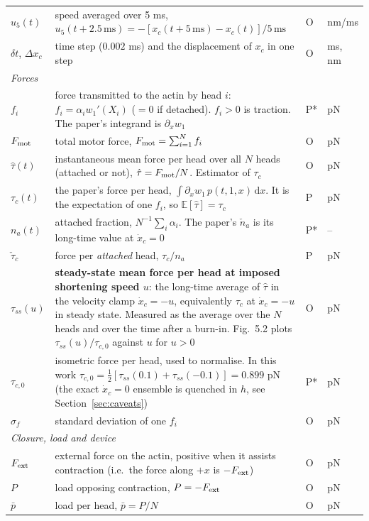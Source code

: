 \documentclass[11pt,a4paper]{article}
\newcommand{\dd}{\mathrm{d}}
\newcommand{\tauz}{\tau_{c,0}}
\begin{document}
{\begin{longtable}{p{2.5cm}p{8.5cm}p{1.0cm}p{1.9cm}}
$u_5(t)$ & speed averaged over 5 ms, $u_5(t+2.5\,\mathrm{ms})=-[x_c(t+5\,\mathrm{ms})-x_c(t)]/5\,\mathrm{ms}$ & O & nm/ms\\
$\delta t$, $\Delta x_c$ & time step ($0.002$ ms) and the displacement of $x_c$ in one step & O & ms, nm\\
\midrule
\multicolumn{4}{l}{\emph{Forces}}\\
$f_i$ & force transmitted to the actin by head $i$: $f_i=\alpha_iw_1'(X_i)$ ($=0$ if detached). $f_i>0$ is traction. The paper's integrand is $\partial_xw_1$ & P* & pN\\
$F_{\rm mot}$ & total motor force, $F_{\rm mot}=\sum_{i=1}^Nf_i$ & O & pN\\
$\hat\tau(t)$ & instantaneous mean force per head over all $N$ heads (attached or not), $\hat\tau=F_{\rm mot}/N$. Estimator of $\tau_c$ & O & pN\\
$\tau_c(t)$ & the paper's force per head, $\int\partial_xw_1\,p(t,1,x)\,\dd x$. It is the expectation of one $f_i$, so $\mathbb E[\hat\tau]=\tau_c$ & P & pN\\
$n_a(t)$ & attached fraction, $N^{-1}\sum_i\alpha_i$. The paper's $\check n_a$ is its long-time value at $\dot x_c=0$ & P* & --\\
$\check\tau_c$ & force per \emph{attached} head, $\tau_c/n_a$ & P & pN\\
$\tau_{ss}(u)$ & \textbf{steady-state mean force per head at imposed shortening speed $u$}: the long-time average of $\hat\tau$ in the velocity clamp $\dot x_c=-u$, equivalently $\tau_c$ at $\dot x_c=-u$ in steady state. Measured as the average over the $N$ heads and over the time after a burn-in. Fig.~5.2 plots $\tau_{ss}(u)/\tauz$ against $u$ for $u>0$ & O & pN\\
$\tau_{c,0}$ & isometric force per head, used to normalise. In this work $\tauz=\tfrac12[\tau_{ss}(0.1)+\tau_{ss}(-0.1)]=0.899$ pN (the exact $\dot x_c=0$ ensemble is quenched in $h$, see Section~\ref{sec:caveats}) & P* & pN\\
$\sigma_f$ & standard deviation of one $f_i$ & O & pN\\
\midrule
\multicolumn{4}{l}{\emph{Closure, load and device}}\\
$F_{\rm ext}$ & external force on the actin, positive when it assists contraction (i.e.\ the force along $+x$ is $-F_{\rm ext}$) & O & pN\\
$P$ & load opposing contraction, $P=-F_{\rm ext}$ & O & pN\\
$\bar p$ & load per head, $\bar p=P/N$ & O & pN\\

\end{longtable}}
\end{document}
